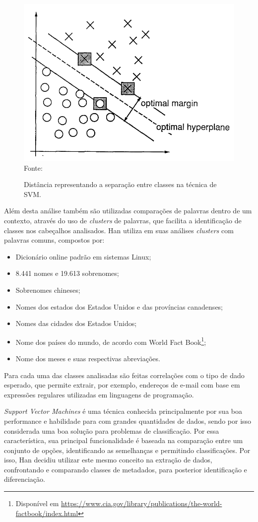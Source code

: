 \begin{figure}[h!]
    \centering
    \caption{Distância representando a separação entre classes na técnica de SVM.}
    \includegraphics[width=0.6\linewidth]{./assets/images/svm-graph}
    \center\footnotesize{Fonte: \cite{Vapnik-SVM}}
    \label{fig:svm-graph}
\end{figure}

Além desta análise também são utilizadas comparações de palavras dentro de um contexto, através do uso de \textit{clusters} de palavras, que facilita a identificação de classes nos cabeçalhos analisados. Han \cite{Han-SVM} utiliza em suas análises \textit{clusters} com palavras comuns, compostos por:

\begin{itemize}
    \item Dicionário online padrão em sistemas Linux;
    \item 8.441 nomes e 19.613 sobrenomes;
    \item Sobrenomes chineses;
    \item Nomes dos estados dos Estados Unidos e das províncias canadenses;
    \item Nomes das cidades dos Estados Unidos;
    \item Nome dos países do mundo, de acordo com World Fact Book\footnote{Disponível em \url{https://www.cia.gov/library/publications/the-world-factbook/index.html}};
    \item Nome dos meses e suas respectivas abreviações.
\end{itemize}

Para cada uma das classes analisadas são feitas correlações com o tipo de dado esperado, que permite extrair, por exemplo, endereços de e-mail com base em expressões regulares utilizadas em linguagens de programação.

\emph{Support Vector Machines} é uma técnica conhecida principalmente por sua boa performance e habilidade para com grandes quantidades de dados, sendo por isso considerada uma boa solução para problemas de classificação. Por essa característica, sua principal funcionalidade é baseada na comparação entre um conjunto de opções, identificando as semelhanças e permitindo classificações. Por isso, Han \cite{Han-SVM} decidiu utilizar este mesmo conceito na extração de dados, confrontando e comparando classes de metadados, para posterior identificação e diferenciação.

